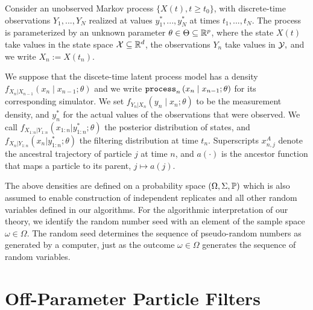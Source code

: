 \documentclass[11pt]{article}
\begin{document}
Consider an unobserved Markov process $\{X(t),t  \geq t_0\}$, with discrete-time observations $Y_1,...,Y_N$ realized at values $y_1^*,...,y_N^*$ at times $t_1,..., t_N$.
The process is parameterized by an unknown parameter $\theta \in \Theta \subseteq \mathbb{R}^p$, where the state $X(t)$ take values in the state space ${\mathcal{X}} \subseteq \mathbb{R}^d$, the observations $Y_n$ take values in ${\mathcal{Y}},$ and we write $X_n := X(t_n)$. 


We suppose that the discete-time latent process model has a density $f_{X_n|X_{n-1}}\left(x_{n} \mid x_{n-1}; \theta\right)$ and we write $\texttt{process}_n\left(x_n\mid x_{n-1}; \theta\right)$ for its corresponding simulator.
We set $f_{Y_n|X_n}\left(y_n \mid x_n; \theta\right)$ to be the measurement density, and $y_n^*$ for the actual values of the observations that were observed.
We call $f_{X_{1:n}|Y_{1:n}}(x_{1:n}|y_{1:n}^*; \theta)$ the posterior distribution of states, and $f_{X_{n}|Y_{1:n}}(x_n|y_{1:n}^*; \theta)$ the filtering distribution at time $t_n$.
Superscripts $x_{n,j}^A$ denote the ancestral trajectory of particle $j$ at time $n$, and $a(\cdot)$ is the ancestor function that maps a particle to its parent, $j \mapsto a(j)$.

The above densities are defined on a probability space $(\Omega, \Sigma, \mathbb{P})$ which is also assumed to enable construction of independent replicates and all other random variables defined in our algorithms.
For the algorithmic interpretation of our theory, we identify the random number seed with an element of the sample space $\omega \in \Omega$. The random seed determines the sequence of pseudo-random numbers as generated by a computer, just as the outcome $\omega\in\Omega$ generates the sequence of random variables.



\section{Off-Parameter Particle Filters}
\end{document}
